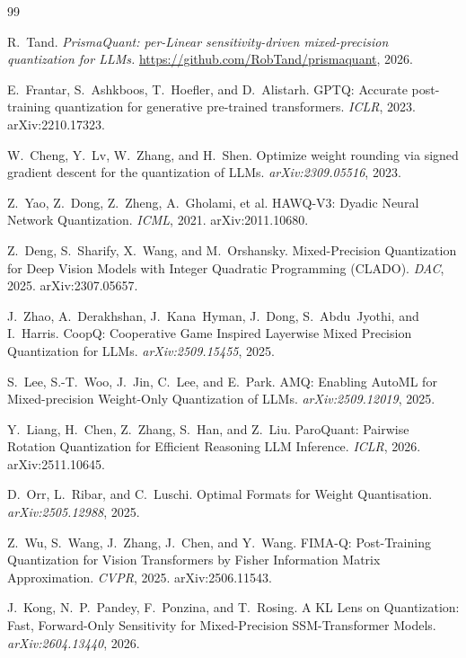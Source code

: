 \documentclass[11pt]{article}
\theoremstyle{plain}
\theoremstyle{definition}
\begin{document}
\begin{thebibliography}{99}

 R.~Tand. \emph{PrismaQuant: per-Linear sensitivity-driven
  mixed-precision quantization for LLMs.}
  \url{https://github.com/RobTand/prismaquant}, 2026.

 E.~Frantar, S.~Ashkboos, T.~Hoefler, and D.~Alistarh. GPTQ:
  Accurate post-training quantization for generative pre-trained transformers.
  \emph{ICLR}, 2023. arXiv:2210.17323.

 W.~Cheng, Y.~Lv, W.~Zhang, and H.~Shen. Optimize weight
  rounding via signed gradient descent for the quantization of LLMs.
  \emph{arXiv:2309.05516}, 2023.

 Z.~Yao, Z.~Dong, Z.~Zheng, A.~Gholami, et al.
  HAWQ-V3: Dyadic Neural Network Quantization. \emph{ICML}, 2021. arXiv:2011.10680.

 Z.~Deng, S.~Sharify, X.~Wang, and M.~Orshansky.
  Mixed-Precision Quantization for Deep Vision Models with Integer Quadratic
  Programming (CLADO). \emph{DAC}, 2025. arXiv:2307.05657.

 J.~Zhao, A.~Derakhshan, J.~Kana~Hyman, J.~Dong,
  S.~Abdu~Jyothi, and I.~Harris. CoopQ: Cooperative Game Inspired Layerwise
  Mixed Precision Quantization for LLMs. \emph{arXiv:2509.15455}, 2025.

 S.~Lee, S.-T.~Woo, J.~Jin, C.~Lee, and E.~Park. AMQ: Enabling
  AutoML for Mixed-precision Weight-Only Quantization of LLMs.
  \emph{arXiv:2509.12019}, 2025.

 Y.~Liang, H.~Chen, Z.~Zhang, S.~Han, and Z.~Liu.
  ParoQuant: Pairwise Rotation Quantization for Efficient Reasoning LLM
  Inference. \emph{ICLR}, 2026. arXiv:2511.10645.

 D.~Orr, L.~Ribar, and C.~Luschi. Optimal Formats for Weight
  Quantisation. \emph{arXiv:2505.12988}, 2025. %

 Z.~Wu, S.~Wang, J.~Zhang, J.~Chen, and Y.~Wang.
  FIMA-Q: Post-Training Quantization for Vision Transformers by Fisher
  Information Matrix Approximation. \emph{CVPR}, 2025. arXiv:2506.11543.

 J.~Kong, N.~P.~Pandey, F.~Ponzina, and T.~Rosing.
  A KL Lens on Quantization: Fast, Forward-Only Sensitivity for Mixed-Precision
  SSM-Transformer Models. \emph{arXiv:2604.13440}, 2026.


\end{thebibliography}
\end{document}

